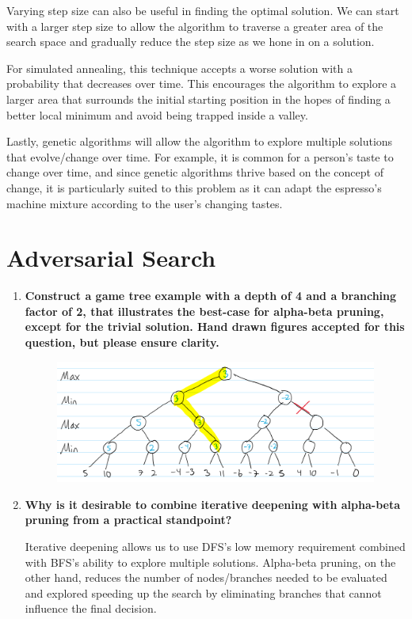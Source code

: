 \documentclass[a4paper]{article}
\begin{document}
\begin{sloppypar}
\begin{enumerate}[start=9,label=Q\arabic*,left=0pt]
    Varying step size can also be useful in finding the optimal solution. We can start with a larger step size to allow the algorithm
    to traverse a greater area of the search space and gradually reduce the step size as we hone in on a solution. 

    For simulated annealing, this technique accepts a worse solution with a probability that decreases over time. This encourages the algorithm
    to explore a larger area that surrounds the initial starting position in the hopes of finding a better local minimum and avoid being trapped
    inside a valley. 

    Lastly, genetic algorithms will allow the algorithm to explore multiple solutions that evolve/change over time. For example,
    it is common for a person's taste to change over time, and since genetic algorithms thrive based on the concept of change, it is particularly suited
    to this problem as it can adapt the espresso's machine mixture according to the user's changing tastes.
\end{enumerate}

\section{Adversarial Search}

\begin{enumerate}[start=12,label=Q\arabic*,left=0pt]
    \item \textbf{Construct a game tree example with a depth of 4 and a branching factor of 2, that illustrates the best-case for alpha-beta pruning, except for the trivial solution. Hand drawn figures accepted for this question, but please ensure clarity.}
    \begin{figure}[H]
        \centering  
        \includegraphics[height=0.2\textheight]{Q12_tree.png}
        \label{fig:Q12_tree}
    \end{figure}

    \item \textbf{Why is it desirable to combine iterative deepening with alpha-beta pruning from a practical standpoint?}
    \par Iterative deepening allows us to use DFS's low memory requirement combined with BFS's ability to explore multiple solutions.
    Alpha-beta pruning, on the other hand, reduces the number of nodes/branches needed to be evaluated and explored speeding up the search
    by eliminating branches that cannot influence the final decision.


\end{enumerate}
\end{sloppypar}
\end{document}
